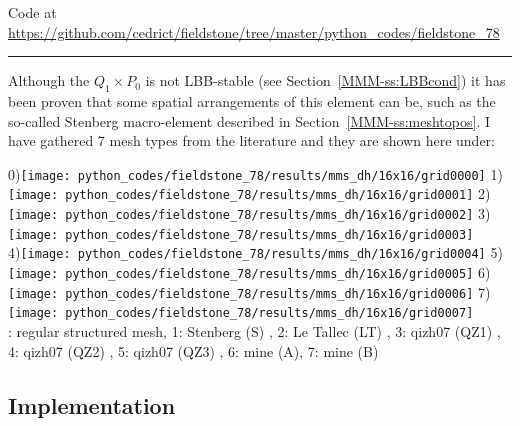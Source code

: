 %

\begin{center}
Code at \url{https://github.com/cedrict/fieldstone/tree/master/python_codes/fieldstone_78}
\end{center}

\par\noindent\rule{\textwidth}{0.4pt}



Although the $Q_1\times P_0$ is not LBB-stable (see Section~\ref{MMM-ss:LBBcond})
it has been proven that some spatial arrangements of this element can be, such as the
so-called Stenberg macro-element described in Section~\ref{MMM-ss:meshtopos}.
I have gathered 7 mesh types from the literature and they are shown 
here under: 

\begin{center}
0)\texttt{[image: python\_codes/fieldstone\_78/results/mms\_dh/16x16/grid0000]}
1)\texttt{[image: python\_codes/fieldstone\_78/results/mms\_dh/16x16/grid0001]}
2)\texttt{[image: python\_codes/fieldstone\_78/results/mms\_dh/16x16/grid0002]}
3)\texttt{[image: python\_codes/fieldstone\_78/results/mms\_dh/16x16/grid0003]}\\
4)\texttt{[image: python\_codes/fieldstone\_78/results/mms\_dh/16x16/grid0004]}
5)\texttt{[image: python\_codes/fieldstone\_78/results/mms\_dh/16x16/grid0005]}
6)\texttt{[image: python\_codes/fieldstone\_78/results/mms\_dh/16x16/grid0006]}
7)\texttt{[image: python\_codes/fieldstone\_78/results/mms\_dh/16x16/grid0007]}\\
{: regular structured mesh, 
1: Stenberg (S) \cite{sten84},
2: Le Tallec (LT) \cite{leta81},
3: qizh07 (QZ1) \cite{qizh07} ,
4: qizh07 (QZ2) \cite{qizh07},
5: qizh07 (QZ3) \cite{qizh07},
6: mine (A),
7: mine (B)}
\end{center}

\subsection*{Implementation}

